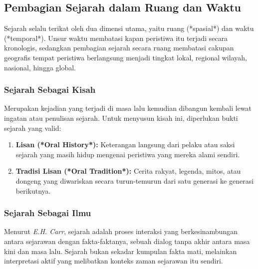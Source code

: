 \documentclass[12pt, a4paper]{article}
\begin{document}
\subsection{Pembagian Sejarah dalam Ruang dan Waktu}
Sejarah selalu terikat oleh dua dimensi utama, yaitu ruang (*spasial*) dan waktu (*temporal*). Unsur waktu membatasi kapan peristiwa itu terjadi secara kronologis, sedangkan pembagian sejarah secara ruang membatasi cakupan geografis tempat peristiwa berlangsung menjadi tingkat lokal, regional wilayah, nasional, hingga global.

\subsubsection{Sejarah Sebagai Kisah}
Merupakan kejadian yang terjadi di masa lalu kemudian dibangun kembali lewat ingatan atau penulisan sejarah. Untuk menyusun kisah ini, diperlukan bukti sejarah yang valid:
\begin{enumerate}
	\item \textbf{Lisan (*Oral History*):} Keterangan langsung dari pelaku atau saksi sejarah yang masih hidup mengenai peristiwa yang mereka alami sendiri.
	\item \textbf{Tradisi Lisan (*Oral Tradition*):} Cerita rakyat, legenda, mitos, atau dongeng yang diwariskan secara turun-temurun dari satu generasi ke generasi berikutnya.
\end{enumerate}

\subsubsection{Sejarah Sebagai Ilmu}
Menurut \textit{E.H. Carr}, sejarah adalah proses interaksi yang berkesinambungan antara sejarawan dengan fakta-faktanya, sebuah dialog tanpa akhir antara masa kini dan masa lalu. Sejarah bukan sekadar kumpulan fakta mati, melainkan interpretasi aktif yang melibatkan konteks zaman sejarawan itu sendiri.
\end{document}
